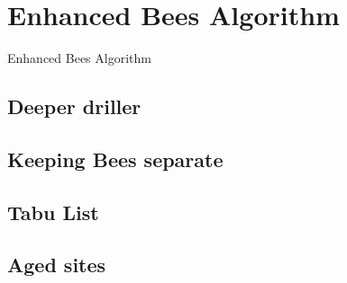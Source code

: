 \section{Enhanced Bees Algorithm}


\begin{algorithm}[H]
   \caption{Enhanced Bees Algorithm}
\end{algorithm}




\subsection{Deeper driller}

\subsection{Keeping Bees separate}

\subsection{Tabu List}


\subsection{Aged sites}



